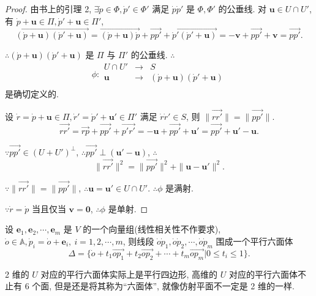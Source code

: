 \documentclass{ctexart}
\begin{document}
\begin{proof}
    由书上的引理 2, $\exists\dot{p}\in\varPhi,\dot{p}'\in\varPhi'$ 满足 $\dot{p}\dot{p}'$ 是 $\varPhi,\varPhi'$ 的公垂线. 对 $\boldsymbol{u}\in U\cap U'$, 有 $\dot{p}+\boldsymbol{u}\in\varPi,\dot{p}'+\boldsymbol{u}\in\varPi'$,
    \[\overrightarrow{(\dot{p}+\boldsymbol{u})(\dot{p}'+\boldsymbol{u})}=\overrightarrow{(\dot{p}+\boldsymbol{u})\dot{p}}+\overrightarrow{pp'}+\overrightarrow{\dot{p}'(\dot{p}'+\boldsymbol{u})}=-\boldsymbol{v}+\overrightarrow{pp'}+\boldsymbol{v}=\overrightarrow{pp'}.\]

    $\therefore(\dot{p}+\boldsymbol{u})(\dot{p}'+\boldsymbol{u})$ 是 $\varPi$ 与 $\varPi'$ 的公垂线. $\therefore$
    \[\phi:\begin{array}{rcl}
        U\cap U' & \to & S \\
        \boldsymbol{u} & \to & (\dot{p}+\boldsymbol{u})(\dot{p}'+\boldsymbol{u}) \\
    \end{array}\]
    是确切定义的.

    设 $\dot{r}=\dot{p}+\boldsymbol{u}\in\varPi,\dot{r}'=\dot{p}'+\boldsymbol{u}'\in\varPi'$ 满足 $\dot{r}\dot{r}'\in S$, 则 $\|\overrightarrow{rr'}\|=\|\overrightarrow{pp'}\|$.
    \[\overrightarrow{rr'}=\overrightarrow{rp}+\overrightarrow{pp'}+\overrightarrow{p'r'}=-\boldsymbol{u}+\overrightarrow{pp'}+\boldsymbol{u}'=\overrightarrow{pp'}+\boldsymbol{u}'-\boldsymbol{u}.\]

    $\because\overrightarrow{pp'}\in(U+U')^\perp$, $\therefore\overrightarrow{pp'}\perp(\boldsymbol{u}'-\boldsymbol{u})$, $\therefore$
    \[\|\overrightarrow{rr'}\|^2=\|\overrightarrow{pp'}\|^2+\|\boldsymbol{u}-\boldsymbol{u}'\|^2.\]

    $\because\|\overrightarrow{rr'}\|=\|\overrightarrow{pp'}\|$, $\therefore\boldsymbol{u}=\boldsymbol{u}'\in U\cap U'$. $\therefore\phi$ 是满射.

    $\because\dot{r}=\dot{p}$ 当且仅当 $\boldsymbol{v}=\boldsymbol{0}$, $\therefore\phi$ 是单射.
\end{proof}
设 $\boldsymbol{e}_1,\boldsymbol{e}_2,\cdots,\boldsymbol{e}_m$ 是 $V$ 的一个向量组(线性相关性不作要求), $\dot{o}\in\mathbb{A},\dot{p}_i=\dot{o}+\boldsymbol{e}_i,\ i=1,2,\cdots,m$, 则线段 $\dot{o}\dot{p}_1,\dot{o}\dot{p}_2,\cdots,\dot{o}\dot{p}_m$ 围成一个平行六面体
\[\Delta=\{\dot{o}+t_1\overrightarrow{op_1}+t_2\overrightarrow{op_2}+\cdots+t_m\overrightarrow{op_m}|0\leq t_i\leq1\}.\]

2 维的 $U$ 对应的平行六面体实际上是平行四边形, 高维的 $U$ 对应的平行六面体不止有 6 个面, 但是还是将其称为``六面体'', 就像仿射平面不一定是 2 维的一样.
\end{document}
